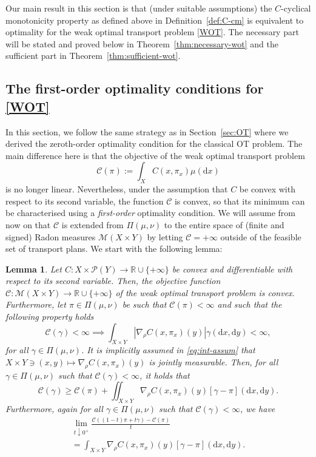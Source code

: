 \documentclass[leqno, 11pt, a4paper]{amsart}
\newtheorem{lem}{Lemma}
\theoremstyle{definition}
\newcommand{\R}{\mathbb{R}}
\newcommand{\C}{\mathscr{C}}
\newcommand{\cP}{\mathcal{P}}
\newcommand{\cM}{\mathcal{M}}
\newcommand{\dd}{\mathrm{d}}
\newcommand{\extendedR}{\R \cup \{+\infty\}}
\begin{document}
Our main result in this section is that (under suitable assumptions) the $C$-cyclical monotonicity property as defined above in Definition~\ref{def:C-cm} is equivalent to optimality for the weak optimal transport problem \eqref{WOT}. The necessary part will be stated and proved below in Theorem~\ref{thm:necessary-wot} and the sufficient part in Theorem~\ref{thm:sufficient-wot}.

\subsection{The first-order optimality conditions for \eqref{WOT}} In this section, we follow the same strategy as in Section~\ref{sec:OT} where we derived the zeroth-order optimality condition for the classical OT problem. The main difference here is that the objective of the weak optimal transport problem 
$$\C(\pi) := \int_{X} C(x, \pi_x) \mu(\dd x)$$
is 
no longer linear. Nevertheless, under the assumption that $C$ be convex with respect to its second variable, the function $\C$ is convex, so that its minimum can be characterised using a \textit{first-order} optimality condition. We will assume from now on that $\C$ is extended from $\Pi(\mu, \nu)$ to the entire space of (finite and signed) Radon measures $\cM(X \times Y)$ by letting $\C = +\infty$ outside of the feasible set of transport plans. We start with the following lemma:

\begin{lem}\label{lem:wot-obj-cv-subdiff}
	Let $C : X \times \cP(Y) \to \extendedR$ be convex and differentiable with respect to its second variable. Then, the objective function $\C : \cM(X \times Y) \to \extendedR$ of the weak optimal transport problem is convex. Furthermore,  let $\pi \in \Pi(\mu, \nu)$ be such that $\C(\pi) < \infty$ and such that the following property holds 
	\begin{equation}\label{eq:int-assum}\tag{A$_\pi$}
		\C(\gamma) < \infty \implies \int_{X \times Y} |\nabla_\rho C(x, \pi_x)(y)| \gamma(\dd x, \dd y) < \infty,
	\end{equation}
	for all $\gamma \in \Pi(\mu, \nu)$. It is implicitly assumed in \eqref{eq:int-assum} that $X \times Y \ni (x,y)\mapsto \nabla_\rho C(x, \pi_x)(y)$ is jointly measurable. Then, for all $\gamma \in \Pi(\mu, \nu)$ such that $\C(\gamma)< \infty$, it holds that
	\begin{equation}\label{eq:algebraic-subgradient}
		\C(\gamma) \geq \C(\pi) + \iint_{X \times Y} \nabla_\rho C(x, \pi_x)(y) [\gamma - \pi](\dd x, \dd y).
	\end{equation}
	Furthermore, again  for all $\gamma \in \Pi(\mu, \nu)$ such that $\C(\gamma)< \infty$, we have
		\begin{multline}\label{eq:gat-dif-sub}
			\lim_{t \downarrow 0^+} \frac{\C((1-t)\pi + t \gamma) - \C(\pi)}{t} \\ = \int_{X \times Y} \nabla_\rho C(x, \pi_x)(y) [\gamma - \pi](\dd x, \dd y).
		\end{multline}
\end{lem}
\end{document}
